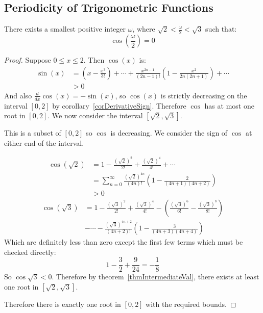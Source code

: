 \documentclass[../Main.tex]{subfiles}
\begin{document}
\subsection{Periodicity of Trigonometric Functions}
\begin{lemma}
    There exists a smallest positive integer $\omega$, where $\sqrt{2} < \frac{\omega}{2} < \sqrt{3}$ such that:
    \begin{equation*}
        \cos\left(\frac{\omega}{2}\right) = 0
    \end{equation*}
    \label{lemRootOfCos}
\end{lemma}
\begin{proof}
    Suppose $0 \leq x \leq 2$. Then $\cos(x)$ is:
    \begin{align*}
        \sin(x) &= \left(x - \frac{x^3}{3!}\right) + \cdots + \frac{x^{2n-1}}{(2n-1)!}\left(1 - \frac{x^2}{2n(2n+1)}\right) + \cdots \\
        &>0
    \end{align*}
    And also $\frac{d}{dx} \cos(x) = -\sin(x)$, so $\cos(x)$ is strictly decreasing on the interval $[0, 2]$ by corollary~\ref{corDerivativeSign}. Therefore $\cos$ has at most one root in $[0, 2]$. We now consider the interval $\left[\sqrt{2}, \sqrt{3}\right]$.\par
    This is a subset of $[0, 2]$ so $\cos$ is decreasing. We consider the sign of $\cos$ at either end of the interval.\par
    \begin{align*}
        \cos(\sqrt{2}) &= 1 - \frac{(\sqrt{2})^2}{2!} + \frac{(\sqrt{2})^4}{4!} + \cdots \\
        &= \sum_{n = 0}^\infty \frac{(\sqrt{2})^{4n}}{(4n)!}\left(1 - \frac{2}{(4n + 1)(4n + 2)}\right) \\
        &>0
    \end{align*}
    \begin{align*}
        \cos(\sqrt{3}) &= 1 - \frac{(\sqrt{3})^2}{2!} + \frac{(\sqrt{3})^4}{4!} - \left(\frac{(\sqrt{3})^6}{6!} - \frac{(\sqrt{3})^8}{8!}\right) \\
        &- \cdots - \frac{(\sqrt{3})^{4n+2}}{(4n+2)!}\left(1 - \frac{3}{(4n + 3)(4n + 4)}\right)
    \end{align*}
    Which are definitely less than zero except the first few terms which must be checked directly:
    \begin{equation*}
        1 - \frac{3}{2} + \frac{9}{24} = -\frac{1}{8}
    \end{equation*}
    So $\cos{\sqrt{3}} < 0$.
    Therefore by theorem~\ref{thmIntermediateVal}, there exists at least one root in $[\sqrt{2}, \sqrt{3}]$.\par
    Therefore there is exactly one root in $[0, 2]$ with the required bounds.
\end{proof}
\end{document}

